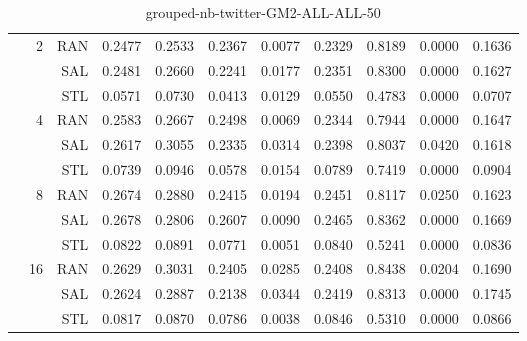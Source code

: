 \begin{center}
\begin{table}[htbp]
\begin{tabular}{ | r | r | r | r | r | r | r | r | r | r | r |}
 & \multirow{3}{*}{2} & RAN & 0.2477 & 0.2533 & 0.2367 & 0.0077 & 0.2329 & 0.8189 & 0.0000 & 0.1636\\ \cline{3-11}
 &   & SAL & 0.2481 & 0.2660 & 0.2241 & 0.0177 & 0.2351 & 0.8300 & 0.0000 & 0.1627\\ \cline{3-11}
 &   & STL & 0.0571 & 0.0730 & 0.0413 & 0.0129 & 0.0550 & 0.4783 & 0.0000 & 0.0707\\ \cline{2-11}
 & \multirow{3}{*}{4} & RAN & 0.2583 & 0.2667 & 0.2498 & 0.0069 & 0.2344 & 0.7944 & 0.0000 & 0.1647\\ \cline{3-11}
 &   & SAL & 0.2617 & 0.3055 & 0.2335 & 0.0314 & 0.2398 & 0.8037 & 0.0420 & 0.1618\\ \cline{3-11}
 &   & STL & 0.0739 & 0.0946 & 0.0578 & 0.0154 & 0.0789 & 0.7419 & 0.0000 & 0.0904\\ \cline{2-11}
 & \multirow{3}{*}{8} & RAN & 0.2674 & 0.2880 & 0.2415 & 0.0194 & 0.2451 & 0.8117 & 0.0250 & 0.1623\\ \cline{3-11}
 &   & SAL & 0.2678 & 0.2806 & 0.2607 & 0.0090 & 0.2465 & 0.8362 & 0.0000 & 0.1669\\ \cline{3-11}
 &   & STL & 0.0822 & 0.0891 & 0.0771 & 0.0051 & 0.0840 & 0.5241 & 0.0000 & 0.0836\\ \cline{2-11}
 & \multirow{3}{*}{16} & RAN & 0.2629 & 0.3031 & 0.2405 & 0.0285 & 0.2408 & 0.8438 & 0.0204 & 0.1690\\ \cline{3-11}
 &   & SAL & 0.2624 & 0.2887 & 0.2138 & 0.0344 & 0.2419 & 0.8313 & 0.0000 & 0.1745\\ \cline{3-11}
 &   & STL & 0.0817 & 0.0870 & 0.0786 & 0.0038 & 0.0846 & 0.5310 & 0.0000 & 0.0866\\ \cline{2-11}
\hline
\end{tabular}
\caption{grouped-nb-twitter-GM2-ALL-ALL-50}
\end{table}
\end{center}

